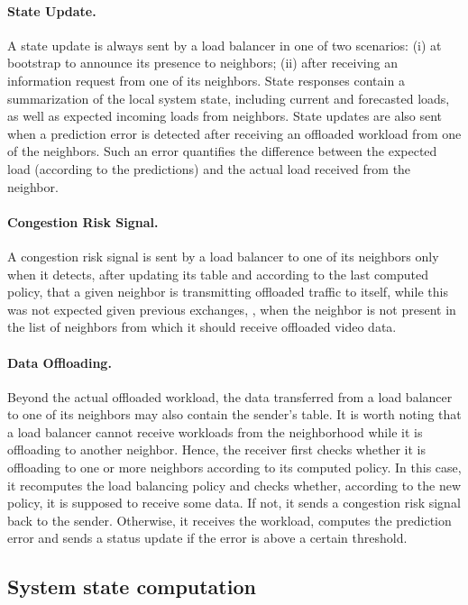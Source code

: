 \paragraph{State Update.} A state update is always sent by a load balancer in one of two scenarios: (i) at bootstrap to announce its presence to neighbors; (ii) after receiving an information request from one of its neighbors. State responses contain a summarization of the local system state, including current and forecasted loads, as well as expected incoming loads from neighbors. State updates are also sent when a prediction error is detected after receiving an offloaded workload from one of the neighbors. Such an error quantifies the difference between the expected load (according to the predictions) and the actual load received from the neighbor. 

\paragraph{Congestion Risk Signal.} A congestion risk signal is sent by a load balancer to one of its neighbors only when it detects, after updating its table and according to the last computed policy, that a given neighbor is transmitting offloaded traffic to itself, while this was not expected given previous exchanges, \ie, when the neighbor is not present in the list of neighbors from which it should receive offloaded video data.

\paragraph{Data Offloading.} Beyond the actual offloaded workload, the data transferred from a load balancer to one of its neighbors may also contain the sender's table. It is worth noting that a load balancer cannot receive workloads from the neighborhood while it is offloading to another neighbor. Hence, the receiver first checks whether it is offloading to one or more neighbors according to its computed policy. In this case, it recomputes the load balancing policy and checks whether, according to the new policy, it is supposed to receive some data. If not, it sends a congestion risk signal back to the sender. Otherwise, it receives the workload, computes the prediction error and sends a status update if the error is above a certain threshold. 

\subsection{System state computation}\label{sec:monitor}

